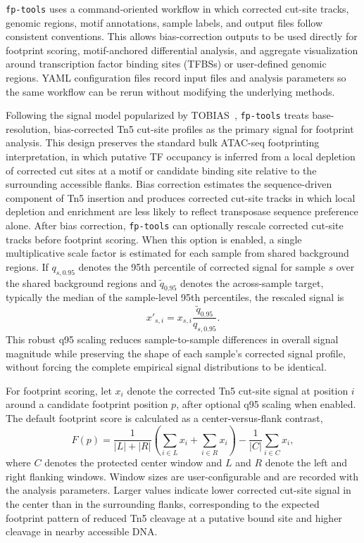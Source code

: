\documentclass[biomedinformatics,article,submit,pdftex,moreauthors]{Definitions/mdpi}
\begin{document}
\texttt{fp-tools} uses a command-oriented workflow in which corrected cut-site
tracks, genomic regions, motif annotations, sample labels, and output files
follow consistent conventions. This allows bias-correction outputs to be used
directly for footprint scoring, motif-anchored differential analysis, and
aggregate visualization around transcription factor binding sites (TFBSs) or
user-defined genomic regions. YAML configuration files record input files and
analysis parameters so the same workflow can be rerun without modifying the
underlying methods.

Following the signal model popularized by TOBIAS~\cite{bentsen2020},
\texttt{fp-tools} treats base-resolution, bias-corrected Tn5 cut-site profiles
as the primary signal for footprint analysis. This design preserves the standard
bulk ATAC-seq footprinting interpretation, in which putative TF occupancy is
inferred from a local depletion of corrected cut sites at a motif or candidate
binding site relative to the surrounding accessible flanks. Bias correction
estimates the sequence-driven component of Tn5 insertion and produces corrected
cut-site tracks in which local depletion and enrichment are less likely to
reflect transposase sequence preference alone. After bias correction,
\texttt{fp-tools} can optionally rescale corrected cut-site tracks before
footprint scoring. When this option is enabled, a single multiplicative scale
factor is estimated for each sample from shared background regions. If
$q_{s,0.95}$ denotes the 95th percentile of corrected signal for sample $s$ over
the shared background regions and $\tilde{q}_{0.95}$ denotes the across-sample
target, typically the median of the sample-level 95th percentiles, the rescaled
signal is
\[
x'_{s,i}=x_{s,i}\frac{\tilde{q}_{0.95}}{q_{s,0.95}} .
\]
This robust q95 scaling reduces sample-to-sample differences in overall signal
magnitude while preserving the shape of each sample's corrected signal profile,
without forcing the complete empirical signal distributions to be identical.

For footprint scoring, let $x_i$ denote the corrected Tn5 cut-site signal at
position $i$ around a candidate footprint position $p$, after optional q95
scaling when enabled. The default footprint score is calculated as a
center-versus-flank contrast,
\[
F(p)=\frac{1}{|L|+|R|}\left(\sum_{i\in L}x_i+\sum_{i\in R}x_i\right)-
\frac{1}{|C|}\sum_{i\in C}x_i,
\]
where $C$ denotes the protected center window and $L$ and $R$ denote the left
and right flanking windows. Window sizes are user-configurable and are recorded
with the analysis parameters. Larger values indicate lower corrected cut-site
signal in the center than in the surrounding flanks, corresponding to the
expected footprint pattern of reduced Tn5 cleavage at a putative bound site and
higher cleavage in nearby accessible DNA.
\end{document}
